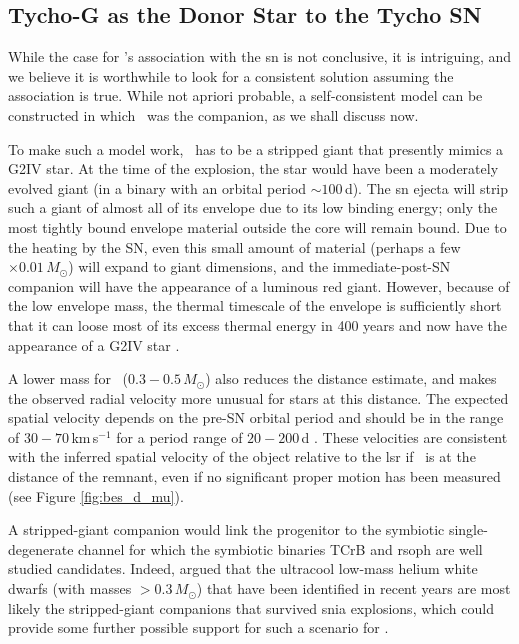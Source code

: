 \subsection{Tycho-G as the Donor Star to the Tycho SN}
\label{redgiant}


While the case for \starg's association with the \gls{sn} is not conclusive, it is intriguing, and we believe it is worthwhile to look for a consistent solution assuming the association is true.
While not {apriori} probable, a self-consistent model can be constructed in which \starg\ was the companion, as we shall discuss now.

To make such a model work, \starg\ has to be a stripped giant that
presently mimics a G2IV star. At the time of the explosion, the star
would have been a moderately evolved giant (in a binary with an
orbital period $\sim 100\,$d). The \gls{sn} ejecta will strip such a giant
of almost all of its envelope \citep{2000ApJS..128..615M} due to its low binding energy; only the most tightly bound envelope material
outside the core will remain bound. Due to the heating by the SN,
even this small amount of material (perhaps a few $\times
0.01\,M_{\odot}$) will expand to giant dimensions, and the
immediate-post-SN companion will have the appearance of a luminous red
giant. However, because of the low envelope mass, the thermal
timescale of the envelope is sufficiently short that it can loose most
of its excess thermal energy in 400 years and now have the appearance
of a G2IV star \citep{2003astro.ph..3660P}.

A lower mass for \starg\ ($0.3-0.5\,M_\odot$) also
reduces the distance estimate, and makes the observed radial velocity more unusual for stars at this distance.
The expected spatial velocity depends on the
pre-SN orbital period and should be in the range of
$30-70\,$km\,s$^{-1}$ for a period range of $20-200\,$d \citep[]{Justham:2008nx}. These velocities are consistent with the
inferred spatial velocity of the object relative to the \gls{lsr} if \starg\
is at the distance of the remnant, even if no significant proper motion has been measured (see Figure \ref{fig:bes_d_mu}).

A stripped-giant companion would link the progenitor to the symbiotic
single-degenerate channel \citep{1999ApJ...522..487H} for which the
symbiotic binaries TCrB and \gls{rsoph} are well studied
candidates. Indeed, \citep[]{Justham:2008nx} argued that
the ultracool low-mass helium white dwarfs (with masses $>
0.3\,M_\odot$) that have been identified in recent years are most
likely the stripped-giant companions that survived \gls{snia} explosions, 
which could provide some further possible support for such a scenario for
\starg.

